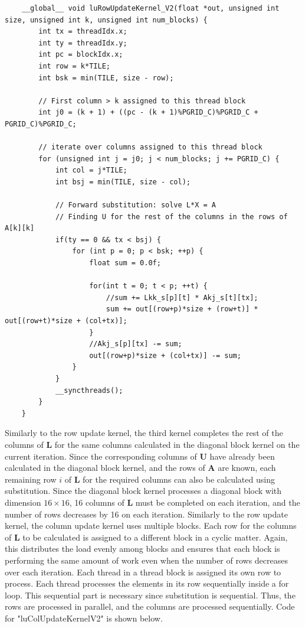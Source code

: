 \documentclass{article}
\begin{document}
\begin{verbatim}
	__global__ void luRowUpdateKernel_V2(float *out, unsigned int size, unsigned int k, unsigned int num_blocks) {
		int tx = threadIdx.x;
		int ty = threadIdx.y;
		int pc = blockIdx.x;
		int row = k*TILE;
		int bsk = min(TILE, size - row);
		
		// First column > k assigned to this thread block
		int j0 = (k + 1) + ((pc - (k + 1)%PGRID_C)%PGRID_C + PGRID_C)%PGRID_C;
		
		// iterate over columns assigned to this thread block
		for (unsigned int j = j0; j < num_blocks; j += PGRID_C) {
			int col = j*TILE;
			int bsj = min(TILE, size - col);
			
			// Forward substitution: solve L*X = A
			// Finding U for the rest of the columns in the rows of A[k][k]
			if(ty == 0 && tx < bsj) {
				for (int p = 0; p < bsk; ++p) {
					float sum = 0.0f;
					
					for(int t = 0; t < p; ++t) {
						//sum += Lkk_s[p][t] * Akj_s[t][tx];
						sum += out[(row+p)*size + (row+t)] * out[(row+t)*size + (col+tx)];
					}
					//Akj_s[p][tx] -= sum;
					out[(row+p)*size + (col+tx)] -= sum;
				}
			}
			__syncthreads();
		}
	}
\end{verbatim}

Similarly to the row update kernel, the third kernel completes the rest of the columns of $\mathbf{L}$ for the same columns calculated in the diagonal block kernel on the current iteration. Since the corresponding columns of $\mathbf{U}$ have already been calculated in the diagonal block kernel, and the rows of $\mathbf{A}$ are known, each remaining row $i$ of $\mathbf{L}$ for the required columns can also be calculated using substitution. Since the diagonal block kernel processes a diagonal block with dimension $16\times 16$, 16 columns of $\mathbf{L}$ must be completed on each iteration, and the number of rows decreases by 16 on each iteration. Similarly to the row update kernel, the column update kernel  uses multiple blocks. Each row for the columns of $\mathbf{L}$ to be calculated is assigned to a different block in a cyclic matter. Again, this distributes the load evenly among blocks and ensures that each block is performing the same amount of work even when the number of rows decreases over each iteration. Each thread in a thread block is assigned its own row to process. Each thread processes the elements in its row sequentially inside a for loop. This sequential part is necessary since substitution is sequential. Thus, the rows are processed in parallel, and the columns are processed sequentially. Code for "luColUpdateKernel\textunderscore V2" is shown below.
\end{document}
